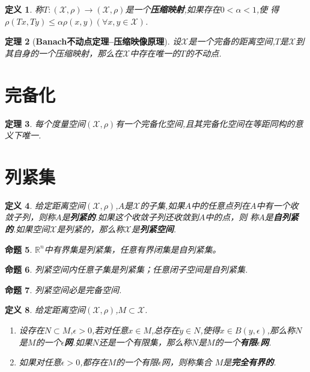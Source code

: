 \documentclass{ctexrep}
\newtheorem{defn}{定义}[section]
\newtheorem{prop}[defn]{命题}
\newtheorem{thm}[defn]{定理}
\newcommand{\X}{\mathscr{X}}
\newcommand{\Xp}{(\mathscr{X},\rho)}
\begin{document}
\begin{defn}
称$T : \Xp \to \Xp$是一个\textbf{压缩映射},如果存在$0 < \alpha < 1$,使
得$\rho(Tx,Ty)\leq\alpha\rho(x,y)(\forall x,y \in \X)$.
\end{defn}

\begin{thm}[\textbf{Banach不动点定理--压缩映像原理}]
设$\X$是一个完备的距离空间,$T$是$\X$到其自身的一个压缩映射，那么在$\X$中存在唯一的$T$的不动点.
\end{thm}

\section{完备化}
\begin{thm}
每个度量空间$\Xp$有一个完备化空间,且其完备化空间在等距同构的意义下唯一.
\end{thm}

\section{列紧集}
\begin{defn}
给定距离空间$\Xp$,$A$是$\X$的子集,如果$A$中的任意点列在$A$中有一个收
敛子列，则称$A$是\textbf{列紧的}.如果这个收敛子列还收敛到$A$中的点，则
称$A$是\textbf{自列紧的}.如果空间$\X$是列紧的，那么称$\X$是\textbf{列紧空间}.
\end{defn}

\begin{prop}
$\mathbb{R}^n$中有界集是列紧集，任意有界闭集是自列紧集。
\end{prop}

\begin{prop}
列紧空间内任意子集是列紧集；任意闭子空间是自列紧集.
\end{prop}

\begin{prop}
列紧空间必是完备空间.
\end{prop}

\begin{defn}
给定距离空间$\Xp$,$M \subset \X$.
\renewcommand{\labelenumi}{(\theenumi)}
\begin{enumerate}
\item 设存在$N \subset M$,$\epsilon > 0$,若对任意$x \in M$,总存在$y
  \in N$,使得$x \in B(y,\epsilon)$,那么称$N$是$M$的一个$\epsilon$\textbf{网}.如果$N$还是一个有限集，那么称$N$是$M$的一个\textbf{有限$\epsilon$网}.
\item 如果对任意$\epsilon>0$,都存在$M$的一个有限$\epsilon$网，则称集合
  $M$是\textbf{完全有界的}.
\end{enumerate}
\end{defn}
\end{document}
